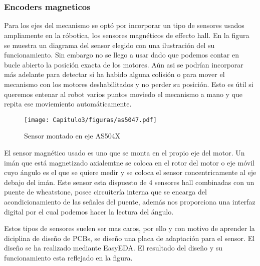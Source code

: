 


\chapter{ }
{}

\subsection{Encoders magneticos}

Para los ejes del mecanismo  se optó por incorporar un tipo de sensores usados ampliamente en la róbotica, 
los sensores magnéticos de effecto hall. En la figura  se muestra un diagrama del sensor elegido con una 
ilustración del su funcionamiento. Sin embargo no se llego a usar dado que podemos contar en bucle abierto la posición exacta de 
los motores. Aún asi se podrían incorporar más adelante para detectar si ha habido alguna colisión o para mover el mecanismo
con los motores deshabilitados y no perder su posición. Esto es útil si queremos entenar al robot varios puntos moviedo el 
mecanismo a mano y que repita ese moviemiento automáticamente.

\begin{figure}[htbp]
    \texttt{[image: Capitulo3/figuras/as5047.pdf]}
    \caption{Sensor montado en eje AS504X}
    \end{figure}

El sensor magnético usado es uno que se monta en el propio eje del motor. Un imán que está magnetizado axialemtne se coloca en 
el rotor del motor o eje móvil cuyo ángulo es el que se quiere medir y se coloca el sensor concentricamente al eje debajo del imán. Este sensor 
esta dispuesto de 4 sensores hall combinadas con un puente de wheatstone, posee circuitería interna que se encarga del acondicionamiento
de las señales del puente, además nos proporciona una interfaz digital por el cual podemos hacer la lectura del ángulo. 

Estos tipos de sensores suelen ser mas caros, por ello y con motivo de aprender la diciplina de diseño de PCBs, se
diseño una placa de adaptación para el sensor. El diseño se ha realizado mediante EasyEDA. El resultado del diseño y su funcionamiento
esta reflejado en la figura. 

